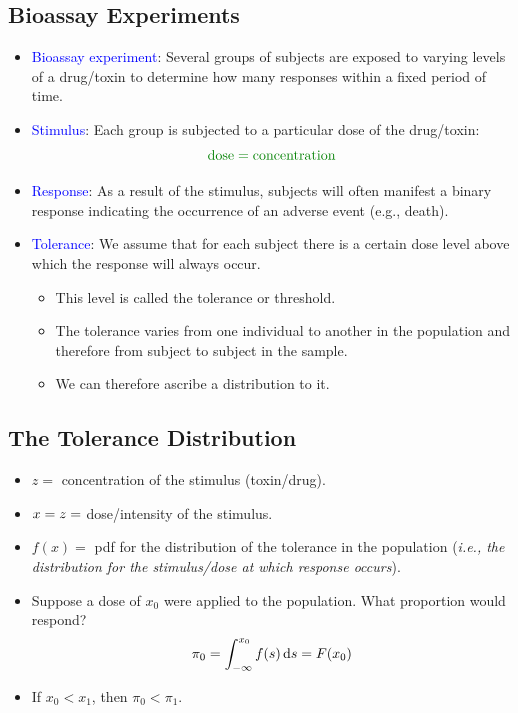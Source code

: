 \documentclass{article}\usepackage[]{graphicx}\usepackage[svgnames]{xcolor}
\let\log\relax%
\begin{document}
\subsection*{Bioassay Experiments}
\begin{itemize}
      \item \textcolor{Blue}{Bioassay experiment}: Several groups of subjects are exposed to varying levels
            of a drug/toxin to determine how many responses within a fixed period of time.
      \item \textcolor{Blue}{Stimulus}: Each group is subjected to a particular dose of the drug/toxin:
            \[ \textcolor{Green}{\text{dose}=\log{\text{concentration}}} \]
      \item \textcolor{Blue}{Response}: As a result of the stimulus, subjects will often manifest a binary
            response indicating the occurrence of an adverse event (e.g., death).
      \item \textcolor{Blue}{Tolerance}: We assume that for each subject there is a certain dose level above
            which the response will always occur.
            \begin{itemize}
                  \item This level is called the tolerance or threshold.
                  \item The tolerance varies from one individual to another in the population and therefore
                        from subject to subject in the sample.
                  \item We can therefore ascribe a distribution to it.
            \end{itemize}
\end{itemize}
\subsection*{The Tolerance Distribution}
\begin{itemize}
      \item $ z =$ concentration of the stimulus (toxin/drug).
      \item $ x=\log{z} =$ dose/intensity of the stimulus.
      \item $ f(x)= $ pdf for the distribution of the tolerance in the population (\emph{i.e., the
                  distribution for the stimulus/dose at which response occurs}).
      \item Suppose a dose of $ x_0 $ were applied to the population. What proportion would
            respond?
            \[ \pi_0=\int_{-\infty}^{x_0}f(s)\odif{s}=F(x_0) \]
      \item If $ x_0<x_1 $, then $ \pi_0<\pi_1 $.
\end{itemize}
\end{document}

